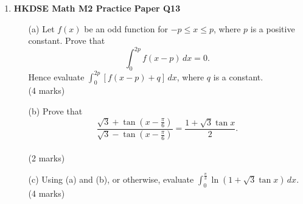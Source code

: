 \documentclass{report}
\begin{document}
\begin{enumerate}
	\item \textbf{HKDSE Math M2 Practice Paper Q13}
	\begin{enumerate}
		\item[(a)]Let $f(x)$ be an odd function for $-p \leq x \leq p$, where $p$ is a positive constant.
		Prove that $$\displaystyle\int_0^{2p} f(x-p)\,dx = 0.$$
		Hence evaluate $\displaystyle\int_0^{2p} [f(x-p)+q]\,dx $, where $q$ is a constant. \\(4 marks)
		\item[(b)]Prove that $$\displaystyle\frac{\sqrt{3} + \tan{\left(x - \displaystyle\frac{\pi}{6}\right)}}{\sqrt{3} - \tan{\left(x - \displaystyle\frac{\pi}{6}\right)}} = \frac{1+\sqrt{3}\tan{x}}{2}.$$ \\(2 marks)
		\item[(c)]Using (a) and (b), or otherwise, evaluate $\displaystyle\int_0^{\tfrac{\pi}{3}} \ln{(1 + \sqrt{3}\tan{x})} \,dx$. \\(4 marks)
	\end{enumerate}

	\newpage


\end{enumerate}
\end{document}
